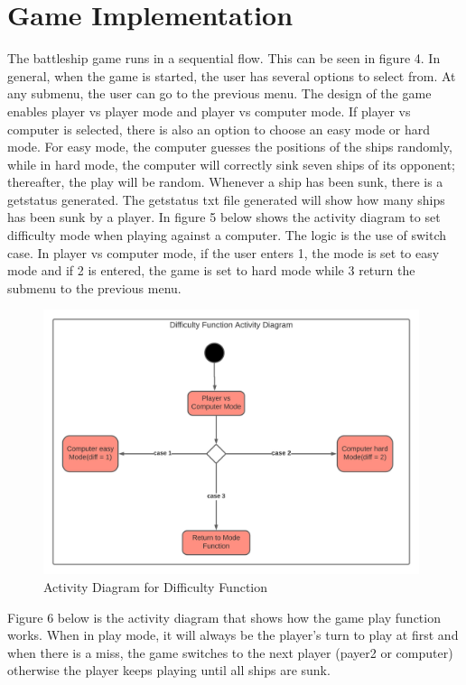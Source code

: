 \documentclass[12pt]{article}
\begin{document}
\section{Game Implementation}
The battleship game runs in a sequential flow. This can be seen in figure 4. In general, when the game is started, the user has several options to select from. At any submenu, the user can go to the previous menu. The design of the game enables player vs player mode and player vs computer mode. If player vs computer is selected, there is also an option to choose an easy mode or hard mode. For easy mode, the computer guesses the positions of the ships randomly, while in hard mode, the computer will correctly sink seven ships of its opponent; thereafter, the play will be random. Whenever a ship has been sunk, there is a getstatus generated. The getstatus txt file generated will show how many ships has been sunk by a player.
In figure 5 below shows the activity diagram to set difficulty mode when playing against a computer. The logic is the use of switch case. In player vs computer mode, if the user enters 1, the mode is set to easy mode and if 2 is entered, the game is set to hard mode while 3 return the submenu to the previous menu.

\begin{figure}[H]
    \centering
    \includegraphics[width=0.98\textwidth]{HEL_template/figures/diff.jpeg}
    \caption{Activity Diagram for Difficulty Function}
    \label{difficulty}
\end{figure}

Figure 6 below is the activity diagram that shows how the game play function works. When in play mode, it will always be the player's turn to play at first and when there is a miss, the game switches to the next player (payer2 or computer) otherwise the player keeps playing until all ships are sunk.
\end{document}
